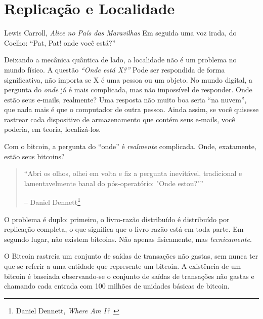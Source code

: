 \chapter{Replicação e Localidade}
\label{les:3}

\begin{chapquote}{Lewis Carroll, \textit{Alice no País das Maravilhas}}
Em seguida uma voz irada, do Coelho: \enquote{Pat, Pat! onde você está?}
\end{chapquote}

Deixando a mecânica quântica de lado, a localidade não é um problema no mundo físico. A questão \textit{\enquote{Onde está X?}} Pode ser respondida de forma significativa, não importa se X é uma pessoa ou um objeto. No mundo digital, a pergunta do \textit{onde} já é mais complicada, mas não impossível de responder. Onde estão seus e-mails, realmente? Uma resposta não muito boa seria \enquote{na nuvem}, que nada mais é que o computador de outra pessoa. Ainda assim, se você quisesse rastrear cada dispositivo de armazenamento que contém seus e-mails, você poderia, em teoria, localizá-los.

Com o bitcoin, a pergunta do \enquote{onde} é \textit{realmente} complicada. Onde, exatamente, estão seus bitcoins?

\begin{quotation}\begin{samepage}
\enquote{Abri os olhos, olhei em volta e fiz a pergunta inevitável, tradicional e lamentavelmente banal do pós-operatório: "Onde estou?"}
\begin{flushright} -- Daniel Dennett\footnote{Daniel Dennett, \textit{Where Am I?}~\cite{where-am-i}}
\end{flushright}\end{samepage}\end{quotation}

O problema é duplo: primeiro, o livro-razão distribuído é distribuído por replicação completa, o que significa que o livro-razão está em toda parte. Em segundo lugar, não existem bitcoins. Não apenas fisicamente, mas \textit{tecnicamente}.

O Bitcoin rastreia um conjunto de saídas de transações não gastas, sem nunca ter que se referir a uma entidade que represente um bitcoin. A existência de um bitcoin é baseiada observando-se o conjunto de saídas de transações não gastas e chamando cada entrada com 100 milhões de unidades básicas de bitcoin.

